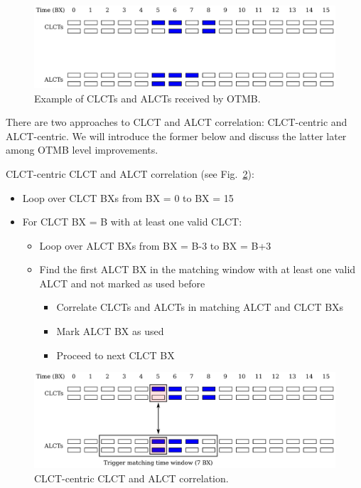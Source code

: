 \begin{figure}[tbh]
        \begin{center}
                \includegraphics[width=0.7\linewidth]{figures/clcts_alcts.pdf}
                \caption{Example of CLCTs and ALCTs received by OTMB.}
                \label{fig:clcts_alcts}
        \end{center}
\end{figure}

There are two approaches to CLCT and ALCT correlation: CLCT-centric and ALCT-centric. We will introduce the former below and discuss the latter later among OTMB level improvements.

CLCT-centric CLCT and ALCT correlation (see Fig.~\ref{fig:clct_alcts}):
\begin{itemize}
    \item Loop over CLCT BXs from BX = 0 to BX = 15
    \item For CLCT BX = B with at least one valid CLCT:
    \begin{itemize}
        \item Loop over ALCT BXs from BX = B-3 to BX = B+3
        \item Find the first ALCT BX in the matching window with at least one valid ALCT and not marked as used before
        \begin{itemize}
            \item Correlate CLCTs and ALCTs in matching ALCT and CLCT BXs
            \item Mark ALCT BX as used
            \item Proceed to next CLCT BX
        \end{itemize}
    \end{itemize}
\end{itemize}

\begin{figure}[tbh]
        \begin{center}
                \includegraphics[width=0.7\linewidth]{figures/clct_alcts.pdf}
                \caption{CLCT-centric CLCT and ALCT correlation.}
                \label{fig:clct_alcts}
        \end{center}
\end{figure}

